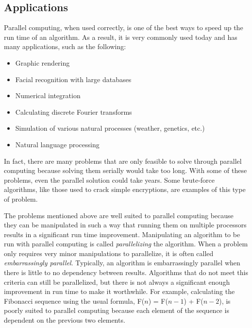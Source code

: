 \subsection*{Applications}

Parallel computing, when used correctly, is one of the best ways to speed up the run time of an algorithm.
As a result, it is very commonly used today and has many applications, such as the following:
\begin{itemize}
\item Graphic rendering
\item Facial recognition with large databases
\item Numerical integration
\item Calculating discrete Fourier transforms
\item Simulation of various natural processes (weather, genetics, etc.)
\item Natural language processing
\end{itemize}
In fact, there are many problems that are only feasible to solve through parallel computing because solving them serially would take too long.
With some of these problems, even the parallel solution could take years.
Some brute-force algorithms, like those used to crack simple encryptions, are examples of this type of problem.

The problems mentioned above are well suited to parallel computing because they can be manipulated in such a way that running them on multiple processors results in a significant run time improvement.
Manipulating an algorithm to be run with parallel computing is called \emph{parallelizing} the algorithm.
When a problem only requires very minor manipulations to parallelize, it is often called \emph{embarrassingly parallel}.
Typically, an algorithm is embarrassingly parallel when there is little to no dependency between results.
Algorithms that do not meet this criteria can still be parallelized, but there is not always a significant enough improvement in run time to make it worthwhile.
For example, calculating the Fibonacci sequence using the usual formula, F($n$) = F($n-1$) + F($n-2$), is poorly suited to parallel computing because each element of the sequence is dependent on the previous two elements.


